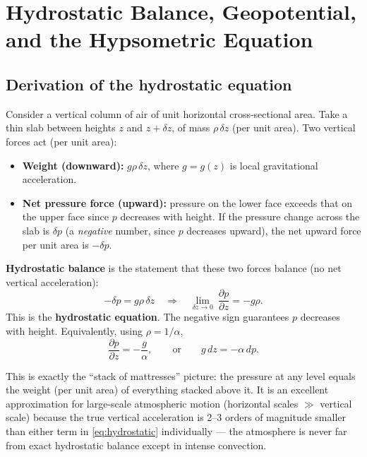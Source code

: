 \documentclass[11pt]{article}
\begin{document}
\section{Hydrostatic Balance, Geopotential, and the Hypsometric Equation}
\label{sec:hydrostatic}

\subsection{Derivation of the hydrostatic equation}

Consider a vertical column of air of unit horizontal cross-sectional area. Take a thin slab between heights $z$ and $z+\delta z$, of mass $\rho\,\delta z$ (per unit area). Two vertical forces act (per unit area):
\begin{itemize}[leftmargin=1.4em]
\item \textbf{Weight (downward):} $g\rho\,\delta z$, where $g=g(z)$ is local gravitational acceleration.
\item \textbf{Net pressure force (upward):} pressure on the lower face exceeds that on the upper face since $p$ decreases with height. If the pressure change across the slab is $\delta p$ (a \emph{negative} number, since $p$ decreases upward), the net upward force per unit area is $-\delta p$.
\end{itemize}
\textbf{Hydrostatic balance} is the statement that these two forces balance (no net vertical acceleration):
\begin{equation}
-\delta p = g\rho\,\delta z \quad\Longrightarrow\quad \lim_{\delta z\to 0}\ \frac{\partial p}{\partial z} = -g\rho.
\label{eq:hydrostatic}
\end{equation}
This is the \textbf{hydrostatic equation}. The negative sign guarantees $p$ decreases with height. Equivalently, using $\rho=1/\alpha$,
\begin{equation}
\frac{\partial p}{\partial z} = -\frac{g}{\alpha}, \qquad\text{or}\qquad g\,dz = -\alpha\,dp.
\label{eq:hydrostatic2}
\end{equation}

\begin{intuition}
This is exactly the ``stack of mattresses'' picture: the pressure at any level equals the weight (per unit area) of everything stacked above it. It is an excellent approximation for large-scale atmospheric motion (horizontal scales $\gg$ vertical scale) because the true vertical acceleration is 2--3 orders of magnitude smaller than either term in \eqref{eq:hydrostatic} individually — the atmosphere is never far from exact hydrostatic balance except in intense convection.
\end{intuition}
\end{document}
